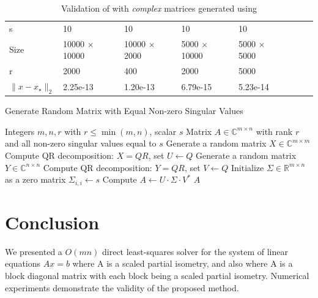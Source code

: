 \documentclass[a4paper,fleqn]{cas-sc}
\theoremstyle{definition}
\theoremstyle{remark}
\begin{document}
\begin{table}
\caption{Validation of  with \emph{complex} matrices generated using  }\label{tab:matrix_with_equal_singular_values1}
\begin{tabular*}{\tblwidth}{@{}LL@{}LL@{}LL@{}LL@{}}
\toprule
  s & 10 & 10 & 10 & 10 \\
        
  Size & 10000 $\times$ 10000 & 10000 $\times$ 2000  & 5000 $\times$ 10000 & 5000 $\times$ 5000\\
         
  r & 2000 & 400 & 2000 & 5000\\
\midrule
 $\|x-x_\star\|_2$  &2.25e-13  &1.20e-13   &6.79e-15  &5.23e-14 \\
\bottomrule
\end{tabular*}
\end{table}

\begin{algorithm}
\caption{Generate Random Matrix with Equal Non-zero Singular Values}\label{algo:matrix_with_equal_singular_values}
\begin{algorithmic}[1]
\Require Integers $m, n, r$ with $r \leq \min(m,n)$, scalar $s$
\Ensure Matrix $A \in \mathbb{C}^{m \times n}$ with rank $r$ and all non-zero singular values equal to $s$
\State Generate a random matrix $X \in \mathbb{C}^{m \times m}$
\State Compute QR decomposition: $X = QR$, set $U \gets Q$
\State Generate a random matrix $Y \in \mathbb{C}^{n \times n}$
\State Compute QR decomposition: $Y = QR$, set $V \gets Q$
\State Initialize $\Sigma \in \mathbb{R}^{m \times n}$ as a zero matrix
    \State $\Sigma_{i,i} \gets s$
\EndFor
\State Compute $A \gets U \cdot \Sigma \cdot V^*$
\State \Return $A$
\end{algorithmic}
\end{algorithm}

\section{Conclusion}\label{sec:conclusion}
We presented a $O(mn)$ direct least-squares solver for the system of linear equations $Ax=b$ where A is a scaled partial isometry, and also where A is a block diagonal matrix with each block being a scaled partial isometry. Numerical experiments demonstrate the validity of the proposed method.  



%





\end{document}
